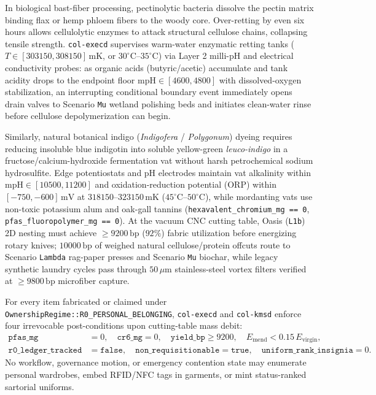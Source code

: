 In biological bast-fiber processing, pectinolytic bacteria dissolve the pectin matrix binding flax or hemp phloem fibers to the woody core.
Over-retting by even six hours allows cellulolytic enzymes to attack structural cellulose chains, collapsing tensile strength. \texttt{col-execd}
supervises warm-water enzymatic retting tanks ($T \in [303150, 308150]\,\mathrm{mK}$, or $30^\circ\mathrm{C}\text{--}35^\circ\mathrm{C}$) via
Layer 2 milli-pH and electrical conductivity probes: as organic acids (butyric/acetic) accumulate and tank acidity drops to the endpoint floor
$\mathrm{mpH} \in [4600, 4800]$ with dissolved-oxygen stabilization, an interrupting conditional boundary event immediately opens drain valves to
Scenario \texttt{Mu} wetland polishing beds and initiates clean-water rinse before cellulose depolymerization can begin.

Similarly, natural botanical indigo (\emph{Indigofera} / \emph{Polygonum}) dyeing requires reducing insoluble blue indigotin into soluble
yellow-green \emph{leuco-indigo} in a fructose/calcium-hydroxide fermentation vat without harsh petrochemical sodium hydrosulfite. Edge
potentiostats and pH electrodes maintain vat alkalinity within $\mathrm{mpH} \in [10500, 11200]$ and oxidation-reduction potential
($\mathrm{ORP}$) within $[-750, -600]\,\mathrm{mV}$ at $318150\text{--}323150\,\mathrm{mK}$ ($45^\circ\mathrm{C}\text{--}50^\circ\mathrm{C}$),
while mordanting vats use non-toxic potassium alum and oak-gall tannins (\texttt{hexavalent\_chromium\_mg == 0}, \texttt{pfas\_fluoropolymer\_mg
== 0}). At the vacuum CNC cutting table, Oasis (\texttt{L1b}) 2D nesting must achieve $\ge 9200\,\mathrm{bp}$ ($92\%$) fabric utilization before
energizing rotary knives; $10000\,\mathrm{bp}$ of weighed natural cellulose/protein offcuts route to Scenario \texttt{Lambda} rag-paper presses
and Scenario \texttt{Mu} biochar, while legacy synthetic laundry cycles pass through $50\,\mu\mathrm{m}$ stainless-steel vortex filters verified
at $\ge 9800\,\mathrm{bp}$ microfiber capture.

\begin{invariant}
\label{inv:nu-r0-purge}
For every item fabricated or claimed under \texttt{OwnershipRegime::R0\_PERSONAL\_BELONGING}, \texttt{col-execd} and \texttt{col-kmsd} enforce
four irrevocable post-conditions upon cutting-table mass debit:
\begin{align}
\mathtt{pfas\_mg} &= 0, \quad \mathtt{cr6\_mg} = 0, \quad \mathtt{yield\_bp} \ge 9200, \quad E_{\mathrm{mend}} < 0.15\,E_{\mathrm{virgin}}, \\
\mathtt{r0\_ledger\_tracked} &= \mathtt{false}, \quad \mathtt{non\_requisitionable} = \mathtt{true}, \quad \mathtt{uniform\_rank\_insignia} = 0.
\end{align}
No workflow, governance motion, or emergency contention state may enumerate personal wardrobes, embed RFID/NFC tags in garments, or mint
status-ranked sartorial uniforms.
\end{invariant}

